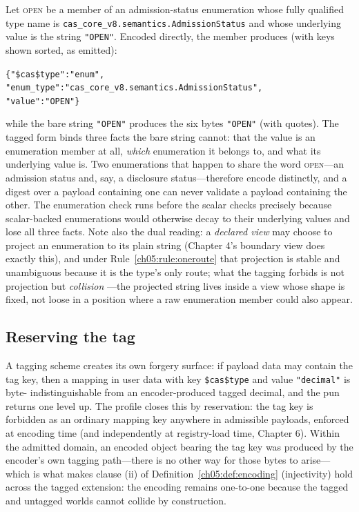 \begin{example}\label{ch05:ex:enum}
Let \textsc{open} be a member of an admission-status enumeration whose
fully qualified type name is
\texttt{cas\_core\_v8.semantics.AdmissionStatus} and whose underlying
value is the string \texttt{"OPEN"}. Encoded directly, the member
produces (with keys shown sorted, as emitted):
\begin{center}
\texttt{\{"\$cas\$type":"enum",}\\
\texttt{"enum\_type":"cas\_core\_v8.semantics.AdmissionStatus",}\\
\texttt{"value":"OPEN"\}}
\end{center}
while the bare string \texttt{"OPEN"} produces the six bytes
\texttt{"OPEN"} (with quotes). The tagged form binds three facts the
bare string cannot: that the value is an enumeration member at all,
\emph{which} enumeration it belongs to, and what its underlying value
is. Two enumerations that happen to share the word \textsc{open}---an
admission status and, say, a disclosure status---therefore encode
distinctly, and a digest over a payload containing one can never
validate a payload containing the other. The enumeration check runs
before the scalar checks precisely because scalar-backed enumerations
would otherwise decay to their underlying values and lose all three
facts. Note also the dual reading: a \emph{declared view} may choose to
project an enumeration to its plain string (Chapter 4's boundary view
does exactly this), and under Rule~\ref{ch05:rule:oneroute} that
projection is stable and unambiguous because it is the type's only
route; what the tagging forbids is not projection but \emph{collision}
---the projected string lives inside a view whose shape is fixed, not
loose in a position where a raw enumeration member could also appear.
\end{example}

\subsection{Reserving the tag}

A tagging scheme creates its own forgery surface: if payload data may
contain the tag key, then a mapping in user data with key
\texttt{\$cas\$type} and value \texttt{"decimal"} is byte-
indistinguishable from an encoder-produced tagged decimal, and the pun
returns one level up. The profile closes this by reservation: the tag key
is forbidden as an ordinary mapping key anywhere in admissible payloads,
enforced at encoding time (and independently at registry-load time,
Chapter 6). Within the admitted domain, an encoded object bearing the tag
key was produced by the encoder's own tagging path---there is no other
way for those bytes to arise---which is what makes clause (ii) of
Definition~\ref{ch05:def:encoding} (injectivity) hold across the tagged
extension: the encoding remains one-to-one because the tagged and untagged
worlds cannot collide by construction.

